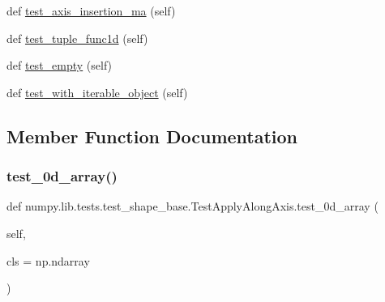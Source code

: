 \begin{DoxyCompactItemize}
\item 
def \hyperlink{classnumpy_1_1lib_1_1tests_1_1test__shape__base_1_1TestApplyAlongAxis_a03d3df8cd7031a885f5d2febd21c063f}{test\+\_\+axis\+\_\+insertion\+\_\+ma} (self)
\item 
def \hyperlink{classnumpy_1_1lib_1_1tests_1_1test__shape__base_1_1TestApplyAlongAxis_a3f97e8685e63a474e6ff16d68a086b93}{test\+\_\+tuple\+\_\+func1d} (self)
\item 
def \hyperlink{classnumpy_1_1lib_1_1tests_1_1test__shape__base_1_1TestApplyAlongAxis_a7cfe5243bcf67da994efeed60a13b40b}{test\+\_\+empty} (self)
\item 
def \hyperlink{classnumpy_1_1lib_1_1tests_1_1test__shape__base_1_1TestApplyAlongAxis_a97b4d10d61b2aed193bfffe05ae96dfa}{test\+\_\+with\+\_\+iterable\+\_\+object} (self)
\end{DoxyCompactItemize}


\subsection{Member Function Documentation}
\mbox{\label{classnumpy_1_1lib_1_1tests_1_1test__shape__base_1_1TestApplyAlongAxis_aaec79bb4b7e3f90d90f8f7f38a135120}} 
\subsubsection{\texorpdfstring{test\+\_\+0d\+\_\+array()}{test\_0d\_array()}}
{\footnotesize\ttfamily def numpy.\+lib.\+tests.\+test\+\_\+shape\+\_\+base.\+Test\+Apply\+Along\+Axis.\+test\+\_\+0d\+\_\+array (\begin{DoxyParamCaption}\item[{}]{self,  }\item[{}]{cls = {\ttfamily np.ndarray} }\end{DoxyParamCaption})}

\mbox{\label{classnumpy_1_1lib_1_1tests_1_1test__shape__base_1_1TestApplyAlongAxis_ac683bcb298301ded2f6c890e11d2536e}} 
